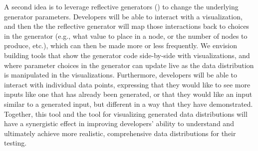 A second idea is to leverage
reflective generators () to change the underlying
generator parameters. Developers will be able to interact with a visualization,
and then the the reflective generator will map those interactions
back to choices
in the generator (e.g., what value to place in a node, or the number of nodes to
produce, etc.), which can then be made more or less frequently. We envision
building tools that show the generator code
side-by-side with visualizations, and where parameter choices in the generator
can update live as the data distribution is manipulated in the visualizations.
Furthermore, developers will be able to interact with individual data points,
expressing that they would like to see more inputs like one that has already
been generated, or that they would like an input similar to a generated input,
but different in a way that they have demonstrated. Together, this tool and the
tool for visualizing generated data distributions will have a synergistic effect
in improving developers' ability to understand and ultimately achieve more
realistic, comprehensive data distributions for their testing.


